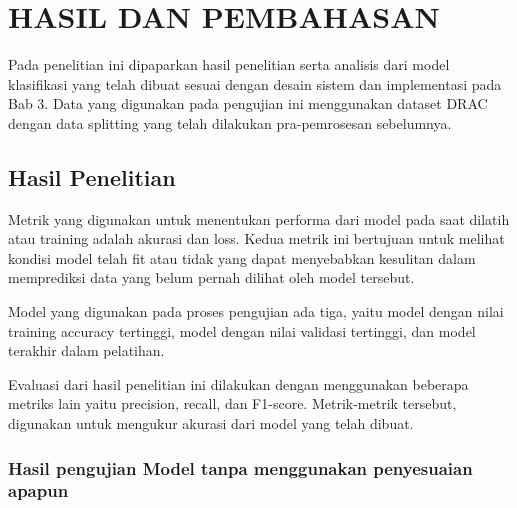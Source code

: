 \chapter{HASIL DAN PEMBAHASAN}
Pada penelitian ini dipaparkan hasil penelitian serta analisis dari model klasifikasi yang telah dibuat sesuai dengan desain sistem dan implementasi pada Bab 3. Data yang digunakan pada pengujian ini menggunakan dataset DRAC dengan data splitting yang telah dilakukan pra-pemrosesan sebelumnya.
\section{Hasil Penelitian}

Metrik yang digunakan untuk menentukan performa dari model pada saat dilatih atau training adalah akurasi dan loss. Kedua metrik ini bertujuan untuk melihat kondisi model telah fit atau tidak yang dapat menyebabkan kesulitan dalam memprediksi data yang belum pernah dilihat oleh model tersebut.

Model yang digunakan pada proses pengujian ada tiga, yaitu model dengan nilai training accuracy tertinggi, model dengan nilai validasi tertinggi, dan model terakhir dalam pelatihan.

Evaluasi dari hasil penelitian ini dilakukan dengan menggunakan beberapa metriks lain yaitu precision, recall, dan F1-score. Metrik-metrik tersebut, digunakan untuk mengukur akurasi dari model yang telah dibuat.

\subsection{Hasil pengujian Model tanpa menggunakan penyesuaian apapun}

